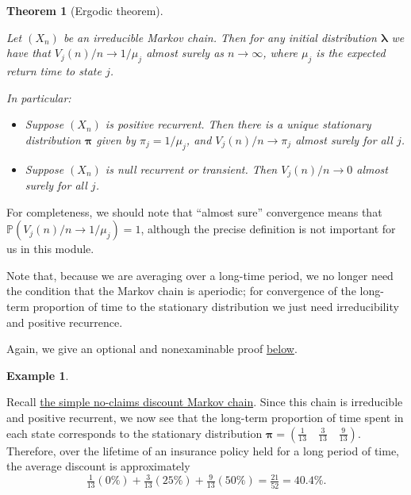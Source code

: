\documentclass[
  a4paper,
]{article}
\providecommand{\tightlist}{%
  \setlength{\itemsep}{0pt}\setlength{\parskip}{0pt}}
\newtheorem{theorem}{Theorem}[section]
\theoremstyle{definition}
\theoremstyle{definition}
\newtheorem{example}{Example}[section]
\theoremstyle{definition}
\theoremstyle{remark}
\begin{document}
\begin{theorem}[Ergodic theorem]
\protect\hypertarget{thm:ergodic}{}\label{thm:ergodic}

Let \((X_n)\) be an irreducible Markov chain. Then for any initial distribution \(\boldsymbol\lambda\) we have that \(V_j(n)/n \to 1/\mu_j\) almost surely as \(n \to \infty\), where \(\mu_j\) is the expected return time to state \(j\).

In particular:

\begin{itemize}
\tightlist
\item
  Suppose \((X_n)\) is positive recurrent. Then there is a unique stationary distribution \(\boldsymbol\pi\) given by \(\pi_j = 1/\mu_j\), and \(V_j(n)/n \to \pi_j\) almost surely for all \(j\).
\item
  Suppose \((X_n)\) is null recurrent or transient. Then \(V_j(n)/n \to 0\) almost surely for all \(j\).
\end{itemize}

\end{theorem}

For completeness, we should note that ``almost sure'' convergence means that \(\mathbb P(V_j(n)/n \to 1/\mu_j) = 1\), although the precise definition is not important for us in this module.

Note that, because we are averaging over a long-time period, we no longer need the condition that the Markov chain is aperiodic; for convergence of the long-term proportion of time to the stationary distribution we just need irreducibility and positive recurrence.

Again, we give an optional and nonexaminable proof \protect\hyperlink{S11-proofs}{below}.

\begin{example}
\protect\hypertarget{exm:ergodic-ex}{}\label{exm:ergodic-ex}

Recall \protect\hyperlink{S06-example1}{the simple no-claims discount Markov chain}. Since this chain is irreducible and positive recurrent, we now see that the long-term proportion of time spent in each state corresponds to the stationary distribution \(\boldsymbol\pi = (\frac1{13} \quad \frac{3}{13}\quad \frac9{13})\). Therefore, over the lifetime of an insurance policy held for a long period of time, the average discount is approximately
\[ \tfrac{1}{13}(0\%) + \tfrac{3}{13}(25\%) + \tfrac{9}{13}(50\%) = \tfrac{21}{52} = 40.4\% . \]

\end{example}
\end{document}
